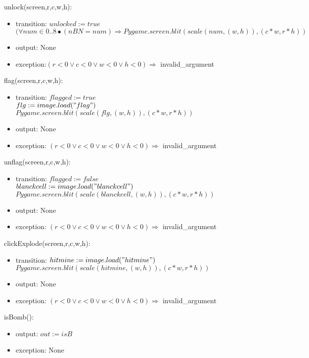 \documentclass[12pt]{article}
\begin{document}
\noindent unlock(screen,r,c,w,h):
\begin{itemize}
\item transition: $unlocked := true$\\
$(\forall num \in 0..8 \bullet (nBN = num) \Rightarrow Pygame.screen.blit(scale(num,(w,h)),(c*w,r*h))$
\item output: None
\item exception:$(r<0 \lor c<0 \lor w<0 \lor h<0) \Rightarrow $ invalid\_argument
\end{itemize}

\noindent flag(screen,r,c,w,h):
\begin{itemize}
\item transition: $flagged := true$\\
$flg := image.load("flag")$\\
$Pygame.screen.blit(scale(flg,(w,h)),(c*w,r*h))$
\item output: None
\item exception: $(r<0 \lor c<0 \lor w<0 \lor h<0) \Rightarrow $ invalid\_argument
\end{itemize}

\noindent unflag(screen,r,c,w,h):
\begin{itemize}
\item transition: $flagged := false$\\
$blanckcell := image.load("blanckcell")$\\
$Pygame.screen.blit(scale(blanckcell,(w,h)),(c*w,r*h))$
\item output: None
\item exception: $(r<0 \lor c<0 \lor w<0 \lor h<0) \Rightarrow $ invalid\_argument
\end{itemize}

\noindent clickExplode(screen,r,c,w,h):
\begin{itemize}
\item transition: 
$hitmine := image.load("hitmine")$\\
$Pygame.screen.blit(scale(hitmine,(w,h)),(c*w,r*h))$
\item output: None
\item exception: $(r<0 \lor c<0 \lor w<0 \lor h<0) \Rightarrow $ invalid\_argument
\end{itemize}

\noindent isBomb():
\begin{itemize}
\item output: $out := isB$
\item exception: None
\end{itemize}
\end{document}
